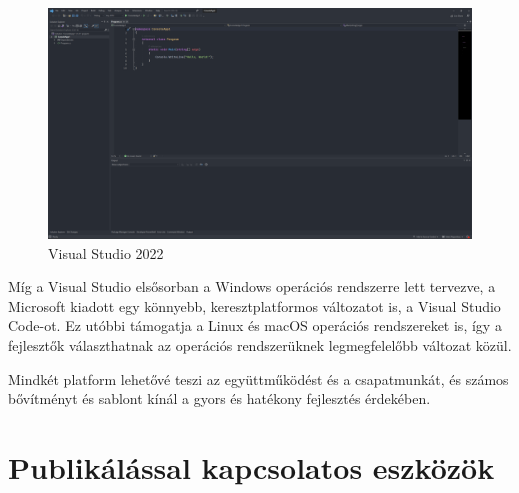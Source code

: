 \begin{figure}[H]
    \centering
    \includegraphics[width=14.0truecm]{images/VisualStuido2022.png}
    \caption{Visual Studio 2022}
    \label{fig:VisualStuido2022}
\end{figure}
Míg a Visual Studio elsősorban a Windows operációs rendszerre lett tervezve, a Microsoft kiadott egy könnyebb, keresztplatformos változatot is, a Visual Studio Code-ot. Ez utóbbi támogatja a Linux és macOS operációs rendszereket is, így a fejlesztők választhatnak az operációs rendszerüknek legmegfelelőbb változat közül.

Mindkét platform lehetővé teszi az együttműködést és a csapatmunkát, és számos bővítményt és sablont kínál a gyors és hatékony fejlesztés érdekében.
\section{Publikálással kapcsolatos eszközök}
